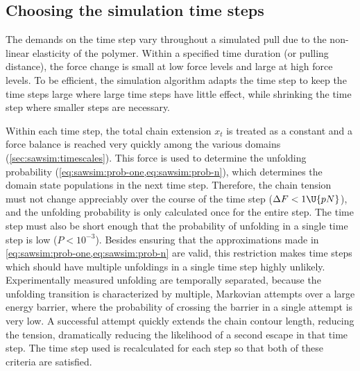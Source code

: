 \subsection{Choosing the simulation time steps}
\label{sec:sawsim:timesteps}

The demands on the time step vary throughout a simulated pull due to
the non-linear elasticity of the polymer.  Within a specified time
duration (or pulling distance), the force change is small at low force
levels and large at high force levels.  To be efficient, the
simulation algorithm adapts the time step to keep the time steps large
where large time steps have little effect, while shrinking the time
step where smaller steps are necessary.

Within each time step, the total chain extension $x_t$ is treated as a
constant and a force balance is reached very quickly among the various
domains (\cref{sec:sawsim:timescales}).  This force is used to
determine the unfolding probability
(\cref{eq:sawsim:prob-one,eq:sawsim:prob-n}), which determines the
domain state populations in the next time step.  Therefore, the chain
tension must not change appreciably over the course of the time step
($\Delta F < 1\U{pN}$), and the unfolding probability is only
calculated once for the entire step.  The time step must also be short
enough that the probability of unfolding in a single time step is low
($P<10^{-3}$).  Besides ensuring that the approximations made in
\cref{eq:sawsim:prob-one,eq:sawsim:prob-n} are valid, this restriction
makes time steps which should have multiple unfoldings in a single
time step highly unlikely.  Experimentally measured unfolding are
temporally separated, because the unfolding transition is
characterized by multiple, Markovian attempts over a large energy
barrier, where the probability of crossing the barrier in a single
attempt is very low.  A successful attempt quickly extends the chain
contour length, reducing the tension, dramatically reducing the
likelihood of a second escape in that time step.  The time step used
is recalculated for each step so that both of these criteria are
satisfied.

